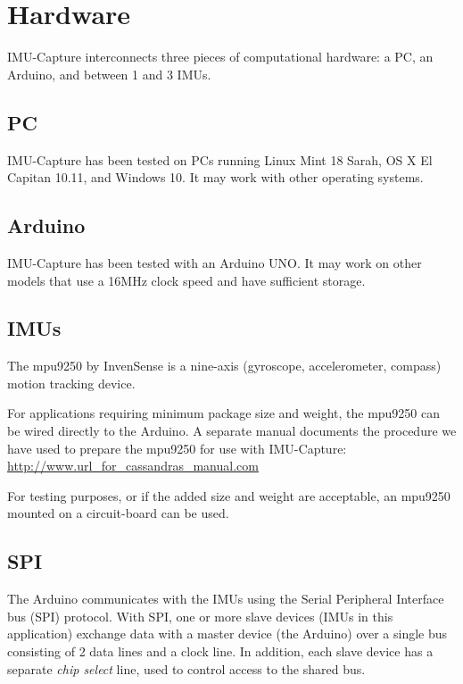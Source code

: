 \documentclass[11pt,letterpaper,article,oneside]{memoir}
\newcommand{\name}{IMU-Capture}
\begin{document}

\chapter{Hardware}

\name{} interconnects three pieces of computational hardware: a PC, an Arduino,
and between 1 and 3 IMUs.


\section{PC}
\name{} has been tested on PCs running Linux Mint 18 Sarah, OS X El Capitan
10.11, and Windows 10. It may work with other operating systems.


\section{Arduino}
\name{} has been tested with an Arduino UNO. It may work on other models that
use a 16MHz clock speed and have sufficient storage.


\section{IMUs}
The mpu9250 by InvenSense is a nine-axis (gyroscope, accelerometer, compass)
motion tracking device.

For applications requiring minimum package size and weight,
the mpu9250 can be wired directly to the Arduino. A separate manual
documents the procedure we have used to prepare the mpu9250 for use with
\name{}:
\url{http://www.url_for_cassandras_manual.com}

For testing purposes, or if the added size and weight are acceptable, an mpu9250
mounted on a circuit-board can be used.


\section{SPI}
The Arduino communicates with the IMUs using the Serial Peripheral Interface bus
(SPI) protocol. With SPI, one or more slave devices (IMUs in this application)
exchange data with a master device (the Arduino) over a single bus consisting of
2 data lines and a clock line. In addition, each slave device has a separate
\emph{chip select} line, used to control access to the shared bus.
\end{document}
